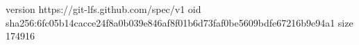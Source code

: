 version https://git-lfs.github.com/spec/v1
oid sha256:6fc05b14cacce24f8a0b039e846af8f01b6d73faf0be5609bdfe67216b9e94a1
size 174916
